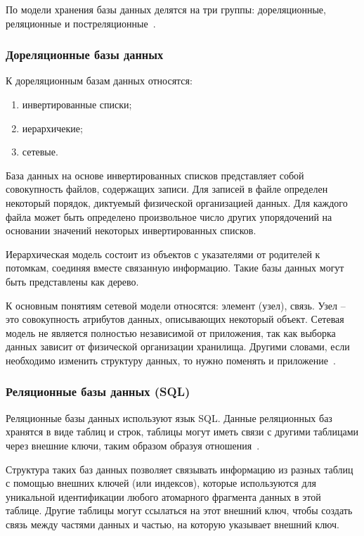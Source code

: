 По модели хранения базы данных делятся на три группы: дореляционные, реляционные и постреляционные~\cite{Date}. 

\subsubsection{Дореляционные базы данных}

К дореляционным базам данных относятся:

\begin{enumerate}[label*=---]
	\item инвертированные списки;
	\item иерархичекие;
	\item сетевые.
\end{enumerate}

База данных на основе инвертированных списков представляет собой совокупность файлов, содержащих записи. Для записей в файле определен некоторый порядок, диктуемый физической организацией данных. Для каждого файла может быть определено произвольное число других упорядочений на основании значений некоторых инвертированных списков. 

Иерархическая модель  состоит из объектов с указателями от родителей к потомкам, соединяя вместе связанную информацию. Такие базы данных могут быть представлены как дерево.

К основным понятиям сетевой модели относятся: элемент (узел), связь. Узел -- это совокупность атрибутов данных, описывающих некоторый объект. Сетевая модель не является полностью независимой от приложения, так как выборка данных зависит от физической организации хранилища. Другими словами, если необходимо изменить структуру данных, то нужно поменять и приложение~\cite{Begg}.

\subsubsection{Реляционные базы данных (SQL)}

Реляционные базы данных используют язык SQL. Данные реляционных баз хранятся в виде таблиц и строк, таблицы могут иметь связи с другими таблицами через внешние ключи, таким образом образуя отношения~\cite{sql}. 

Структура таких баз данных позволяет связывать информацию из разных таблиц с помощью внешних ключей (или индексов), которые используются для уникальной идентификации любого атомарного фрагмента данных в этой таблице. Другие таблицы могут ссылаться на этот внешний ключ, чтобы создать связь между частями данных и частью, на которую указывает внешний ключ.

